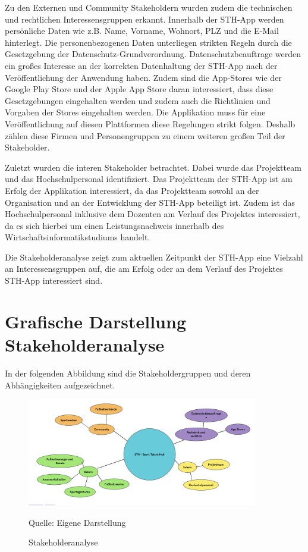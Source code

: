 \noindent
Zu den Externen und Community Stakeholdern wurden zudem die technischen und rechtlichen Interessensgruppen erkannt.
Innerhalb der STH-App werden persönliche Daten wie z.B. Name, Vorname, Wohnort, PLZ und die E-Mail hinterlegt.
Die personenbezogenen Daten unterliegen strikten Regeln durch die Gesetzgebung der Datenschutz-Grundverordnung.
Datenschutzbeauftrage werden ein großes Interesse an der korrekten Datenhaltung der STH-App nach der Veröffentlichung der Anwendung haben.
Zudem sind die App-Stores wie der Google Play Store und der Apple App Store daran interessiert, dass diese Gesetzgebungen eingehalten werden und zudem auch die Richtlinien und Vorgaben der Stores eingehalten werden.
Die Applikation muss für eine Veröffentlichung auf diesen Plattformen diese Regelungen strikt folgen.
Deshalb zählen diese Firmen und Personengruppen zu einem weiteren großen Teil der Stakeholder.

\noindent
Zuletzt wurden die interen Stakeholder betrachtet.
Dabei wurde das Projektteam und das Hochschulpersonal identifiziert.
Das Projektteam der STH-App ist am Erfolg der Applikation interessiert, da das Projektteam sowohl an der Organisation und an der Entwicklung der STH-App beteiligt ist.
Zudem ist das Hochschulpersonal inklusive dem Dozenten am Verlauf des Projektes interessiert, da es sich hierbei um einen Leistungsnachweis innerhalb des Wirtschaftsinformatikstudiums handelt.

\noindent
Die Stakeholderanalyse zeigt zum aktuellen Zeitpunkt der STH-App eine Vielzahl an Interessensgruppen auf, die am Erfolg oder an dem Verlauf des Projektes STH-App interessiert sind.


\section{Grafische Darstellung Stakeholderanalyse}

In der folgenden Abbildung sind die Stakeholdergruppen und deren Abhängigkeiten aufgezeichnet.
\begin{figure}[H]
	\caption[Stakeholderanalyse]{Stakeholderanalyse}
	\centering
	\includegraphics[width=0.9\textwidth]{assets/figures/Stakeholderanalyse.png}
	\begin{flushleft}
		Quelle: Eigene Darstellung
	\end{flushleft}
\end{figure}


